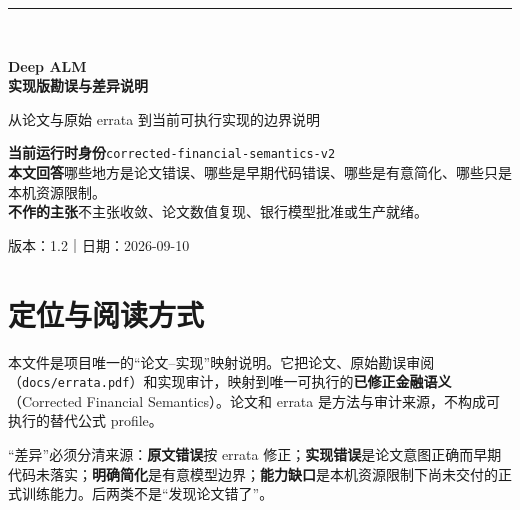 \documentclass[UTF8,10pt,a4paper,fontset=fandol]{ctexart}
\begin{document}
\begin{titlepage}
  \thispagestyle{empty}
  \vspace*{20mm}
  {\color{blue}\rule{26mm}{2.2pt}}\\[9mm]
  {\fontsize{24}{30}\selectfont\bfseries\color{navy}Deep ALM\\[2mm]实现版勘误与差异说明\par}
  \vspace{6mm}
  {\large\color{gray}从论文与原始 errata 到当前可执行实现的边界说明}
  \vfill
  \begin{summarybox}
  \textbf{当前运行时身份}\quad \texttt{corrected-financial-semantics-v2}\\
  \textbf{本文回答}\quad 哪些地方是论文错误、哪些是早期代码错误、哪些是有意简化、哪些只是本机资源限制。\\
  \textbf{不作的主张}\quad 不主张收敛、论文数值复现、银行模型批准或生产就绪。
  \end{summarybox}
  \vfill
  {\color{gray}\small 版本：1.2\quad｜\quad 日期：2026-09-10}
\end{titlepage}

\section{定位与阅读方式}
本文件是项目唯一的“论文--实现”映射说明。它把论文、原始勘误审阅
（\texttt{docs/errata.pdf}）和实现审计，映射到唯一可执行的\textbf{已修正金融语义}
（Corrected Financial Semantics）。论文和 errata 是方法与审计来源，不构成可执行的替代公式 profile。

\begin{warningbox}
“差异”必须分清来源：\textbf{原文错误}按 errata 修正；\textbf{实现错误}是论文意图正确而早期代码未落实；\textbf{明确简化}是有意模型边界；\textbf{能力缺口}是本机资源限制下尚未交付的正式训练能力。后两类不是“发现论文错了”。
\end{warningbox}
\end{document}
